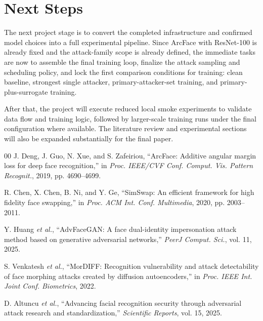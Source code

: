 \documentclass[conference]{IEEEtran}
\begin{document}
\section{Next Steps}
The next project stage is to convert the completed infrastructure and confirmed
model choices into a full experimental pipeline. Since ArcFace with ResNet-100
is already fixed and the attack-family scope is already defined, the immediate
tasks are now to assemble the final training loop, finalize the attack
sampling and scheduling policy, and lock the first comparison conditions for
training: clean baseline, strongest single attacker, primary-attacker-set
training, and primary-plus-surrogate training.

After that, the project will execute reduced local smoke experiments to
validate data flow and training logic, followed by larger-scale training runs
under the final configuration where available. The literature review and
experimental sections will also be expanded substantially for the final paper.

\begin{thebibliography}{00}
 J. Deng, J. Guo, N. Xue, and S. Zafeiriou, ``ArcFace: Additive angular margin loss for deep face recognition,'' in \emph{Proc. IEEE/CVF Conf. Comput. Vis. Pattern Recognit.}, 2019, pp. 4690--4699.

 R. Chen, X. Chen, B. Ni, and Y. Ge, ``SimSwap: An efficient framework for high fidelity face swapping,'' in \emph{Proc. ACM Int. Conf. Multimedia}, 2020, pp. 2003--2011.

 Y. Huang \emph{et al.}, ``AdvFaceGAN: A face dual-identity impersonation attack method based on generative adversarial networks,'' \emph{PeerJ Comput. Sci.}, vol. 11, 2025.

 S. Venkatesh \emph{et al.}, ``MorDIFF: Recognition vulnerability and attack detectability of face morphing attacks created by diffusion autoencoders,'' in \emph{Proc. IEEE Int. Joint Conf. Biometrics}, 2022.

 D. Altuncu \emph{et al.}, ``Advancing facial recognition security through adversarial attack research and standardization,'' \emph{Scientific Reports}, vol. 15, 2025.
\end{thebibliography}
\end{document}
